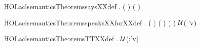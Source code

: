 \newcommand{\HOLaclsemanticsTheoremsrepsXXdef}{\UseVerbatim{HOLaclsemanticsTheoremsrepsXXdef}}
\begin{SaveVerbatim}{HOLaclsemanticsTheoremssaysXXdef}
\HOLTokenTurnstile{} \HOLSymConst{\HOLTokenForall{}}    .
         (  ) \HOLSymConst{=}
     \HOLTokenLeftbrace{} \HOLTokenBar{}  ( )   \HOLConst{\HOLTokenSubset{}}     \HOLTokenRightbrace{}
\end{SaveVerbatim}
\newcommand{\HOLaclsemanticsTheoremssaysXXdef}{\UseVerbatim{HOLaclsemanticsTheoremssaysXXdef}}
\begin{SaveVerbatim}{HOLaclsemanticsTheoremsspeaksXXforXXdef}
\HOLTokenTurnstile{} \HOLSymConst{\HOLTokenForall{}}    .
         (  ) \HOLSymConst{=}
       ( )    ( )   \ensuremath{\cal{U}}(:'v)
      \HOLTokenLeftbrace{}\HOLTokenRightbrace{}
\end{SaveVerbatim}
\newcommand{\HOLaclsemanticsTheoremsspeaksXXforXXdef}{\UseVerbatim{HOLaclsemanticsTheoremsspeaksXXforXXdef}}
\begin{SaveVerbatim}{HOLaclsemanticsTheoremsTTXXdef}
\HOLTokenTurnstile{} \HOLSymConst{\HOLTokenForall{}}  .      \HOLSymConst{=} \ensuremath{\cal{U}}(:'v)
\end{SaveVerbatim}
\newcommand{\HOLaclsemanticsTheoremsTTXXdef}{\UseVerbatim{HOLaclsemanticsTheoremsTTXXdef}}
